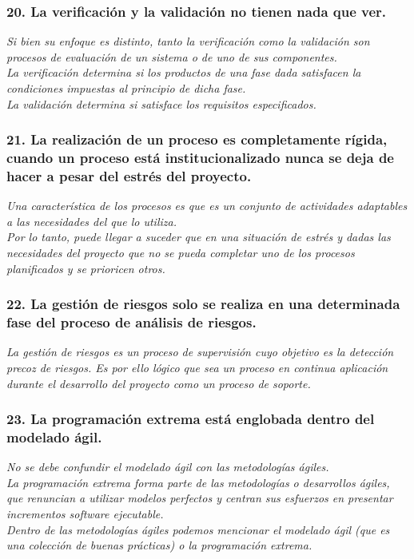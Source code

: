 \subsubsection*{20. La verificación y la validación no tienen nada que ver.}
\textit{Si bien su enfoque es distinto, tanto la verificación como la validación son procesos de evaluación de un sistema o de uno de sus componentes.\\ %
    La verificación determina si los productos de una fase dada satisfacen la condiciones impuestas al principio de dicha fase.\\
    La validación determina si satisface los requisitos especificados.
}
\subsubsection*{21. La realización de un proceso es completamente rígida, cuando un proceso está institucionalizado nunca se deja de hacer a pesar del estrés del proyecto.}
\textit{Una característica de los procesos es que es un conjunto de actividades adaptables a las necesidades del que lo utiliza.
    \\
    Por lo tanto, puede llegar a suceder que en una situación de estrés y dadas las necesidades del proyecto que no se pueda completar uno de los procesos planificados y se prioricen otros.
}

\subsubsection*{22. La gestión de riesgos solo se realiza en una determinada fase del proceso de análisis de riesgos.}
\textit{La gestión de riesgos es un proceso de supervisión cuyo objetivo es la detección precoz de riesgos. Es por ello lógico que sea un proceso en continua aplicación durante el desarrollo del proyecto como un proceso de soporte.
}

\subsubsection*{23. La programación extrema está englobada dentro del modelado ágil.}
\textit{No se debe confundir el modelado ágil con las metodologías ágiles.
    \\
    La programación extrema forma parte de las metodologías o desarrollos ágiles, que renuncian a utilizar modelos perfectos y centran sus esfuerzos en presentar incrementos software ejecutable.
    \\
    Dentro de las metodologías ágiles podemos mencionar el modelado ágil (que es una colección de buenas prácticas) o la programación extrema.
}

